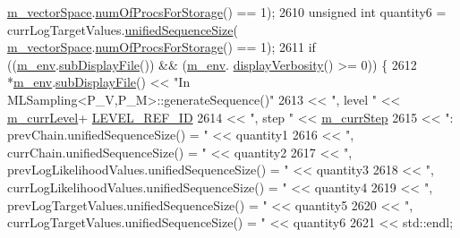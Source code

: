 \begin{DoxyCode}
      \hyperlink{class_q_u_e_s_o_1_1_m_l_sampling_a7bc4c72f65ba9166ed94a6e198b0915b}{m\_vectorSpace}.\hyperlink{class_q_u_e_s_o_1_1_vector_space_a67b0c3620662116f5a346fdaa5faf38e}{numOfProcsForStorage}() == 1);
2610       \textcolor{keywordtype}{unsigned} \textcolor{keywordtype}{int} quantity6 = currLogTargetValues.\hyperlink{class_q_u_e_s_o_1_1_scalar_sequence_a52829afc95e5c36e9db44f40854153b0}{unifiedSequenceSize}(
      \hyperlink{class_q_u_e_s_o_1_1_m_l_sampling_a7bc4c72f65ba9166ed94a6e198b0915b}{m\_vectorSpace}.\hyperlink{class_q_u_e_s_o_1_1_vector_space_a67b0c3620662116f5a346fdaa5faf38e}{numOfProcsForStorage}() == 1);
2611       \textcolor{keywordflow}{if} ((\hyperlink{class_q_u_e_s_o_1_1_m_l_sampling_a13f1ca4fe9f94822fe572a743eaced1d}{m\_env}.\hyperlink{class_q_u_e_s_o_1_1_base_environment_a8a0064746ae8dddfece4229b9ad374d6}{subDisplayFile}()) && (\hyperlink{class_q_u_e_s_o_1_1_m_l_sampling_a13f1ca4fe9f94822fe572a743eaced1d}{m\_env}.
      \hyperlink{class_q_u_e_s_o_1_1_base_environment_a1fe5f244fc0316a0ab3e37463f108b96}{displayVerbosity}() >= 0)) \{
2612         *\hyperlink{class_q_u_e_s_o_1_1_m_l_sampling_a13f1ca4fe9f94822fe572a743eaced1d}{m\_env}.\hyperlink{class_q_u_e_s_o_1_1_base_environment_a8a0064746ae8dddfece4229b9ad374d6}{subDisplayFile}() << \textcolor{stringliteral}{"In MLSampling<P\_V,P\_M>::generateSequence()"}
2613                                 << \textcolor{stringliteral}{", level "} << \hyperlink{class_q_u_e_s_o_1_1_m_l_sampling_af9416874c856e50f3b35270e801f17e4}{m\_currLevel}+
      \hyperlink{_m_l_sampling_level_options_8h_a68d15eaf394d210effcf584b938206d3}{LEVEL\_REF\_ID}
2614                                 << \textcolor{stringliteral}{", step "}  << \hyperlink{class_q_u_e_s_o_1_1_m_l_sampling_a1b1f8ccb4823bdfa26ec652f0807c63e}{m\_currStep}
2615                                 << \textcolor{stringliteral}{": prevChain.unifiedSequenceSize() = "} << quantity1
2616                                 << \textcolor{stringliteral}{", currChain.unifiedSequenceSize() = "} << quantity2
2617                                 << \textcolor{stringliteral}{", prevLogLikelihoodValues.unifiedSequenceSize() = "} << quantity3
2618                                 << \textcolor{stringliteral}{", currLogLikelihoodValues.unifiedSequenceSize() = "} << quantity4
2619                                 << \textcolor{stringliteral}{", prevLogTargetValues.unifiedSequenceSize() = "} << quantity5
2620                                 << \textcolor{stringliteral}{", currLogTargetValues.unifiedSequenceSize() = "} << quantity6
2621                                 << std::endl;

\end{DoxyCode}
